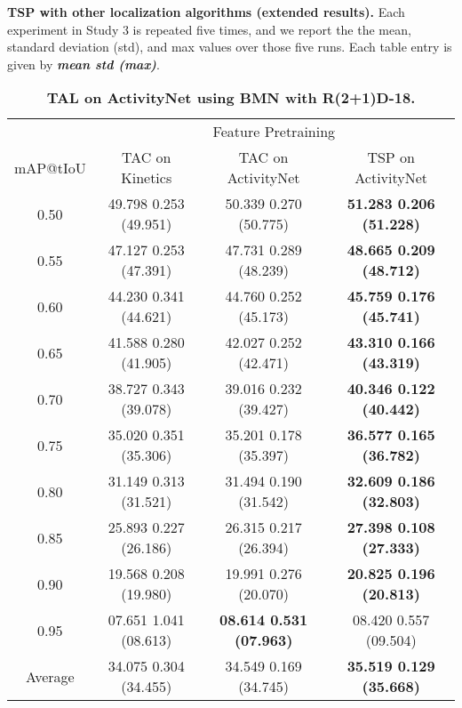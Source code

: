 \documentclass[10pt,twocolumn,letterpaper]{article}
\begin{document}
    
     \begin{table*}[t]
    \small
    \centering
    \caption{\textbf{TSP with other localization algorithms (extended results).} Each experiment in Study 3 is repeated five times, and we report the the mean, standard deviation (std), and max values over those five runs. Each table entry is given by \textit{\textbf{mean  std (max)}}.}
    \label{table:supp_mat_extended_ablation_study_3}

\begin{subtable}{\linewidth}
    \centering
    \vspace{-5pt}
    \caption{\bf TAL on ActivityNet using BMN with R(2+1)D-18.}
    \vspace{-5pt}
    \begin{tabular}{c|ccc}
    \toprule 
            & \multicolumn{3}{c}{Feature Pretraining} \\ 
    mAP@tIoU& TAC on Kinetics                           & TAC on ActivityNet                        & TSP on ActivityNet \\ \midrule
    0.50    & 49.798 {\scriptsize  0.253} (49.951) & 50.339 {\scriptsize  0.270} (50.775) &\bf 51.283 {\scriptsize  0.206} (51.228) \\
    0.55    & 47.127 {\scriptsize  0.253} (47.391) & 47.731 {\scriptsize  0.289} (48.239) &\bf 48.665 {\scriptsize  0.209} (48.712) \\
    0.60    & 44.230 {\scriptsize  0.341} (44.621) & 44.760 {\scriptsize  0.252} (45.173) &\bf 45.759 {\scriptsize  0.176} (45.741) \\
    0.65    & 41.588 {\scriptsize  0.280} (41.905) & 42.027 {\scriptsize  0.252} (42.471) &\bf 43.310 {\scriptsize  0.166} (43.319) \\
    0.70    & 38.727 {\scriptsize  0.343} (39.078) & 39.016 {\scriptsize  0.232} (39.427) &\bf 40.346 {\scriptsize  0.122} (40.442) \\
    0.75    & 35.020 {\scriptsize  0.351} (35.306) & 35.201 {\scriptsize  0.178} (35.397) &\bf 36.577 {\scriptsize  0.165} (36.782) \\
    0.80    & 31.149 {\scriptsize  0.313} (31.521) & 31.494 {\scriptsize  0.190} (31.542) &\bf 32.609 {\scriptsize  0.186} (32.803) \\
    0.85    & 25.893 {\scriptsize  0.227} (26.186) & 26.315 {\scriptsize  0.217} (26.394) &\bf 27.398 {\scriptsize  0.108} (27.333) \\
    0.90    & 19.568 {\scriptsize  0.208} (19.980) & 19.991 {\scriptsize  0.276} (20.070) &\bf 20.825 {\scriptsize  0.196} (20.813) \\
    0.95    & 07.651 {\scriptsize  1.041} (08.613) &\bf 08.614 {\scriptsize  0.531} (07.963) & 08.420 {\scriptsize  0.557} (09.504) \\ \midrule
\rowcolor{Gray}
    Average & 34.075 {\scriptsize  0.304} (34.455) & 34.549 {\scriptsize  0.169} (34.745) &\bf 35.519 {\scriptsize  0.129} (35.668) \\
    \bottomrule
    \end{tabular}
\end{subtable}

\end{table*}
\end{document}
